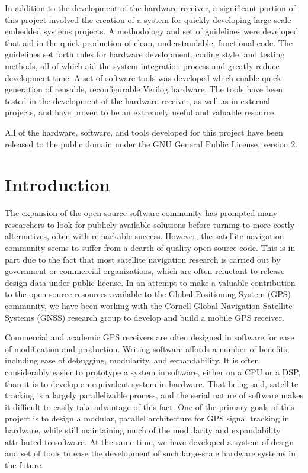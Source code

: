 \documentclass[12pt]{article}
\begin{document}
In addition to the development of the hardware receiver, a significant portion of this project involved the creation of a system for quickly developing large-scale embedded systems projects. A methodology and set of guidelines were developed that aid in the quick production of clean, understandable, functional code. The guidelines set forth rules for hardware development, coding style, and testing methods, all of which aid the system integration process and greatly reduce development time.  A set of software tools was developed which enable quick generation of reusable, reconfigurable Verilog hardware. The tools have been tested in the development of the hardware receiver, as well as in external projects, and have proven to be an extremely useful and valuable resource.

All of the hardware, software, and tools developed for this project have been released to the public domain under the GNU General Public License, version 2.

\newpage
\tableofcontents
\newpage

\section{Introduction}
The expansion of the open-source software community has prompted many researchers to look for publicly available solutions before turning to more costly alternatives, often with remarkable success. However, the satellite navigation community seems to suffer from a dearth of quality open-source code. This is in part due to the fact that most satellite navigation research is carried out by government or commercial organizations, which are often reluctant to release design data under public license. In an attempt to make a valuable contribution to the open-source resources available to the Global Positioning System (GPS) community, we have been working with the Cornell Global Navigation Satellite Systems (GNSS) research group to develop and build a mobile GPS receiver.

Commercial and academic GPS receivers are often designed in software for ease of modification and production. Writing software affords a number of benefits, including ease of debugging, modularity, and expandability. It is often considerably easier to prototype a system in software, either on a CPU or a DSP, than it is to develop an equivalent system in hardware. That being said, satellite tracking is a largely parallelizable process, and the serial nature of software makes it difficult to easily take advantage of this fact. One of the primary goals of this project is to design a modular, parallel architecture for GPS signal tracking in hardware, while still maintaining much of the modularity and expandability attributed to software. At the same time, we have developed a system of design and set of tools to ease the development of such large-scale hardware systems in the future.
\end{document}

